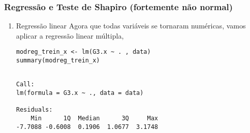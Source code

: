 \documentclass[11pt]{article}
\begin{document}
\subsubsection{Regressão e Teste de Shapiro (fortemente não normal)}
\label{sec:org7f77427}
\begin{enumerate}
\item Regressão linear
\label{sec:org5487071}
Agora que todas variáveis se tornaram numéricas, vamos aplicar a regressão linear múltipla,

\begin{verbatim}
modreg_trein_x <- lm(G3.x ~ . , data)
summary(modreg_trein_x)
\end{verbatim}

\begin{verbatim}

Call:
lm(formula = G3.x ~ ., data = data)

Residuals:
    Min      1Q  Median      3Q     Max 
-7.7088 -0.6008  0.1906  1.0677  3.1748 


\end{verbatim}
\end{enumerate}
\end{document}
